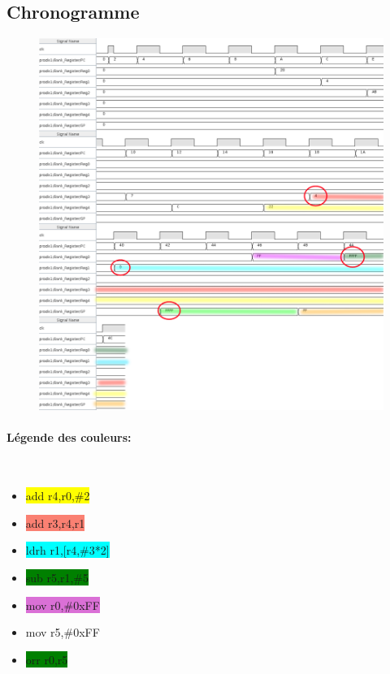 \documentclass[a4paper]{article} %
\begin{document}
\subsection{Chronogramme}
\begin{figure}[H]
    \centering
    \includegraphics[width=.8\textwidth]{src/CHRONO_ET2_V2_COL.png}
    \label{fig:chrono_et2_pic}
\end{figure}

\paragraph{Légende des couleurs:}\mbox{}\\
\begin{itemize}[before=\ttfamily\bfseries]
   \item \colorbox{yellow}{add r4,r0,\#2}
   \item \colorbox{Salmon}{add r3,r4,r1}
   \item \colorbox{Cyan}{ldrh r1,[r4,\#3*2]}
   \item \colorbox{green}{sub r5,r1,\#5}
   \item \colorbox{Orchid}{mov r0,\#0xFF}
   \item \colorbox{Dandelion}{mov r5,\#0xFF}
   \item \colorbox{Green}{orr r0,r5}
\end{itemize}
\end{document}
